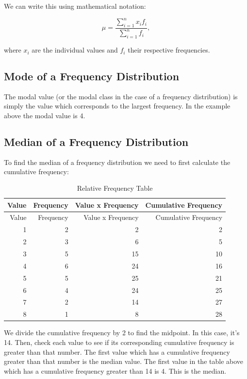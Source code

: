 \documentclass[
]{book}
\begin{document}
We can write this using mathematical notation:

\[\mu=\frac{\sum_{i=1}^n x_i f_i}{\sum_{i=1}^n f_i},\]

where \(x_i\) are the individual values and \(f_i\) their respective frequencies.

\hypertarget{mode-of-a-frequency-distribution}{%
\subsection{Mode of a Frequency Distribution}\label{mode-of-a-frequency-distribution}}

The modal value (or the modal class in the case of a frequency distribution) is simply the value which corresponds to the largest frequency. In the example above the modal value is 4.

\hypertarget{median-of-a-frequency-distribution}{%
\subsection{Median of a Frequency Distribution}\label{median-of-a-frequency-distribution}}

To find the median of a frequency distribution we need to first calculate the cumulative frequency:

\begin{longtable}[]{@{}rrrr@{}}
\caption{\label{tab:table007}Relative Frequency Table}\tabularnewline
\toprule
Value & Frequency & Value x Frequency & Cumulative Frequency \\
\midrule
\endfirsthead
\toprule
Value & Frequency & Value x Frequency & Cumulative Frequency \\
\midrule
\endhead
1 & 2 & 2 & 2 \\
2 & 3 & 6 & 5 \\
3 & 5 & 15 & 10 \\
4 & 6 & 24 & 16 \\
5 & 5 & 25 & 21 \\
6 & 4 & 24 & 25 \\
7 & 2 & 14 & 27 \\
8 & 1 & 8 & 28 \\
\bottomrule
\end{longtable}

We divide the cumulative frequency by 2 to find the midpoint. In this case, it's 14. Then, check each value to see if its corresponding cumulative frequency is greater than that number. The first value which has a cumulative frequency greater than that number is the median value. The first value in the table above which has a cumulative frequency greater than 14 is 4. This is the median.
\end{document}
